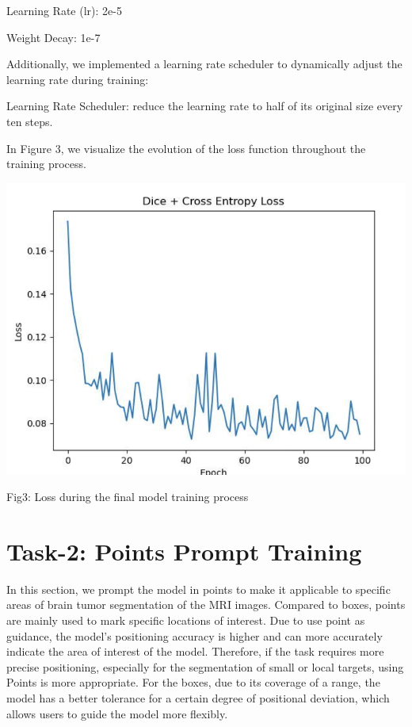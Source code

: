 \documentclass[12pt, a4paper, oneside]{article}
\begin{document}
Learning Rate (lr): 2e-5

Weight Decay: 1e-7

Additionally, we implemented a learning rate scheduler to dynamically adjust the learning rate during training:
 
Learning Rate Scheduler: reduce the learning rate to half of its original size every ten steps.

In Figure 3, we visualize the evolution of the loss function throughout the training process.
\begin{center}
\includegraphics[width=1\textwidth]{2.png}
\caption{Fig3: Loss during the final model training process}
\end{center}

\section{Task-2: Points Prompt Training}
In this section, we prompt the model in points to make it applicable to specific areas of brain tumor segmentation of the MRI images. Compared to boxes, points are mainly used to mark specific locations of interest. Due to use point as guidance, the model's positioning accuracy is higher and can more accurately indicate the area of interest of the model. Therefore, if the task requires more precise positioning, especially for the segmentation of small or local targets, using Points is more appropriate. For the boxes, due to its coverage of a range, the model has a better tolerance for a certain degree of positional deviation, which allows users to guide the model more flexibly.
\end{document}
